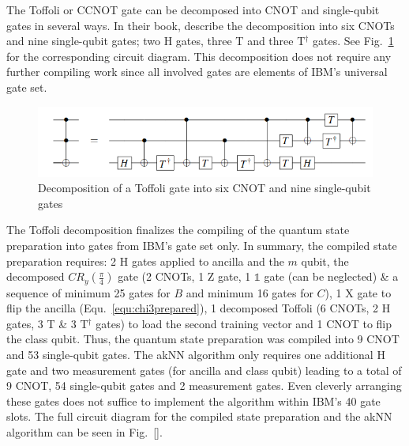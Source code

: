 The Toffoli or CCNOT gate can be decomposed into CNOT and single-qubit gates in several ways. In their book, describe the decomposition into six CNOTs and nine single-qubit gates; two H gates, three T and three T$^\dagger$ gates. See Fig.~\ref{img:toffolidecomp} for the corresponding circuit diagram. This decomposition does not require any further compiling work since all involved gates are elements of IBM's universal gate set.

\begin{figure}[!ht]
       \centering
       \includegraphics[scale=0.5]{img/toffolidecomposition.png}
       \caption[]{\label{img:toffolidecomp} Decomposition of a Toffoli gate into six CNOT and nine single-qubit gates\footnotemark[16]}
\end{figure}


The Toffoli decomposition finalizes the compiling of the quantum state preparation into gates from IBM's gate set only. In summary, the compiled state preparation requires: 2 H gates applied to ancilla and the $m$ qubit, the decomposed $CR_y(\frac{\pi}{4})$ gate (2 CNOTs, 1 Z gate, 1 $\mathbb{1}$ gate (can be neglected) \& a sequence of minimum 25 gates for $B$ and minimum 16 gates for $C$), 1 X gate to flip the ancilla (Equ.~\ref{equ:chi3prepared}), 1 decomposed Toffoli (6 CNOTs, 2 H gates, 3 T \& 3 T$^\dagger$ gates) to load the second training vector and 1 CNOT to flip the class qubit. Thus, the quantum state preparation was compiled into 9 CNOT and 53 single-qubit gates. The akNN algorithm only requires one additional H gate and two measurement gates (for ancilla and class qubit) leading to a total of 9 CNOT, 54 single-qubit gates and 2 measurement gates. Even cleverly arranging these gates does not suffice to implement the algorithm within IBM's 40 gate slots. The full circuit diagram for the compiled state preparation and the akNN algorithm can be seen in Fig.~\ref{}.


